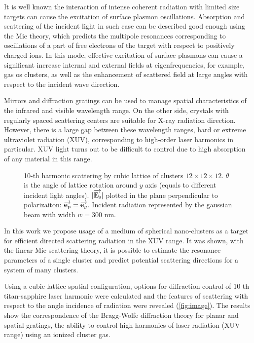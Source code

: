 It is well known the interaction of intense coherent radiation with limited size targets can cause the excitation of surface plasmon oscillations. Absorption and scattering of the incident light in such case can be described good enough using the Mie theory, which predicts the multipole resonances corresponding to oscillations of a part of free electrons of the target with respect to positively charged ions. In this mode, effective excitation of surface plasmons can cause a significant increase
internal and external fields at eigenfrequencies, for example, gas os clusters, as well as the enhancement of scattered field at large angles with respect to the incident wave direction.

Mirrors and diffraction gratings can be used to manage spatial characteristics of the infrared and visible wavelength range. On the other side, crystals with regularly spaced scattering centers are suitable for X-ray radiation direction. However, there is a large gap between these wavelength ranges, hard or extreme ultraviolet radiation (XUV), corresponding to high-order laser harmonics in particular. XUV light turns out to be difficult to control due to high absorption of any material in this range.

\begin{figure}[H]
    \hfil
    \caption{10-th harmonic scattering by cubic lattice of clusters $12\times12\times12$. $\theta$ is the angle of lattice rotation around $y$ axis (equals to different incident light angles). $|\overrightarrow{\textbf{E}_{\textrm{s}}}|$ plotted in the plane perpendicular to polarizaiton: $\overrightarrow{\textbf{e}_{\textrm{p}}} = \overrightarrow{\textbf{e}_{y}}$. Incident radiation represented by the gaussian beam with width $w = 300$ nm.}
    \label{fig:image}
\end{figure}

In this work we propose usage of a medium of spherical nano-clusters as a target for efficient directed scattering radiation in the XUV range. It was shown, with the linear Mie scattering theory, it is possible to estimate the resonance parameters of a single cluster and predict potential scattering directions for a system of many clusters.

Using a cubic lattice spatial configuration, options for diffraction control of 10-th titan-sapphire laser harmonic were calculated and the features of scattering with respect to the angle incidence of radiation were revealed (\autoref{fig:image}). The results show the correspondence of the Bragg-Wolfe diffraction theory for planar and spatial gratings, the ability to control high harmonics of laser radiation (XUV range) using an ionized cluster gas.
